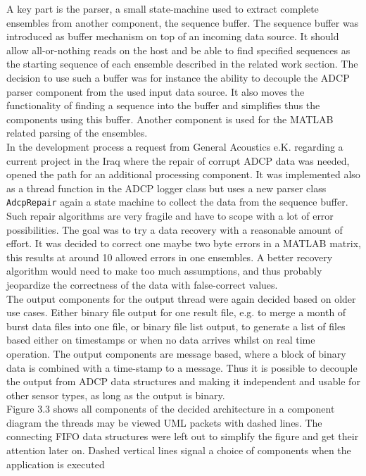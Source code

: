 A key part is the parser, a small state-machine used to extract complete ensembles from another component, the sequence buffer. The sequence buffer was introduced as buffer mechanism on top of an incoming data source. It should allow all-or-nothing reads on the host and be able to find specified sequences as the starting sequence of each ensemble described in the related work section. The decision to use such a buffer was for instance the ability to decouple the ADCP parser component from the used input data source. It also moves the functionality of finding a sequence into the buffer and simplifies thus the components using this buffer. Another component is used for the MATLAB related parsing of the ensembles.\\ In the development process a request from General Acoustics e.K. regarding a current project in the Iraq where the repair of corrupt ADCP data was needed, opened the path for an additional processing component. It was implemented also as a thread function in the ADCP logger class but uses a new parser class \texttt{AdcpRepair} again a state machine to collect the data from the sequence buffer. Such repair algorithms are very fragile and have to scope with a lot of error possibilities. The goal was to try a data recovery with a reasonable amount of effort. It was decided to correct one maybe two byte errors in a MATLAB matrix, this results at around 10 allowed errors in one ensembles. A better recovery algorithm would need to make too much assumptions, and thus probably jeopardize the correctness of the data with false-correct values.\\
The output components for the output thread were again decided based on older use cases. Either binary file output for one result file, e.g. to merge a month of burst data files into one file, or binary file list output, to generate a list of files based either on timestamps or when no data arrives whilst on real time operation. The output components are message based, where a block of binary data is combined with a time-stamp to a message. Thus it is possible to decouple the output from ADCP data structures and making it independent and usable for other sensor types, as long as the output is binary.\\
Figure 3.3 shows all components of the decided architecture in a component diagram the threads may be viewed UML packets with dashed lines. The connecting FIFO data structures were left out to simplify the figure and get their attention later on. Dashed vertical lines signal a choice of components when the application is executed\\ 
